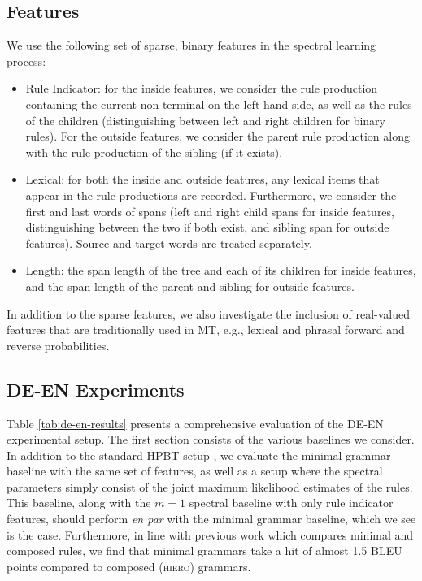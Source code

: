 \documentclass[11pt]{article}
\begin{document}
\subsection{Features}
\label{sec:features}
We use the following set of sparse, binary features in the spectral learning process:
\begin{itemize}[noitemsep]
	\item Rule Indicator: for the inside features, we consider the rule production containing the current non-terminal on the left-hand side, as well as the rules of the children (distinguishing between left and right children for binary rules).  
	For the outside features, we consider the parent rule production along with the rule production of the sibling (if it exists). 
	\item Lexical: for both the inside and outside features, any lexical items that appear in the rule productions are recorded.  
	Furthermore, we consider the first and last words of spans (left and right child spans for inside features, distinguishing between the two if both exist, and sibling span for outside features).  
	Source and target words are treated separately. 
	\item Length: the span length of the tree and each of its children for inside features, and the span length of the parent and sibling for outside features. 	
\end{itemize}
In addition to the sparse features, we also investigate the inclusion of real-valued features that are traditionally used in MT, e.g., lexical and phrasal forward and reverse probabilities. 

\subsection{\textsc{DE-EN} Experiments}

Table \ref{tab:de-en-results} presents a comprehensive evaluation of the \textsc{DE-EN} experimental setup.  
The first section consists of the various baselines we consider. 
In addition to the standard HPBT setup \cite{Chiang2005}, we evaluate the minimal grammar baseline with the same set of features, as well as a setup where the spectral parameters simply consist of the joint maximum likelihood estimates of the rules.  
This baseline, along with the $m=1$ spectral baseline with only rule indicator features, should perform \emph{en par} with the minimal grammar baseline, which we see is the case.  
Furthermore, in line with previous work \cite{Galley2006} which compares minimal and composed rules, we find that minimal grammars take a hit of almost 1.5 BLEU points compared to composed (\textsc{hiero}) grammars.  
\end{document}
